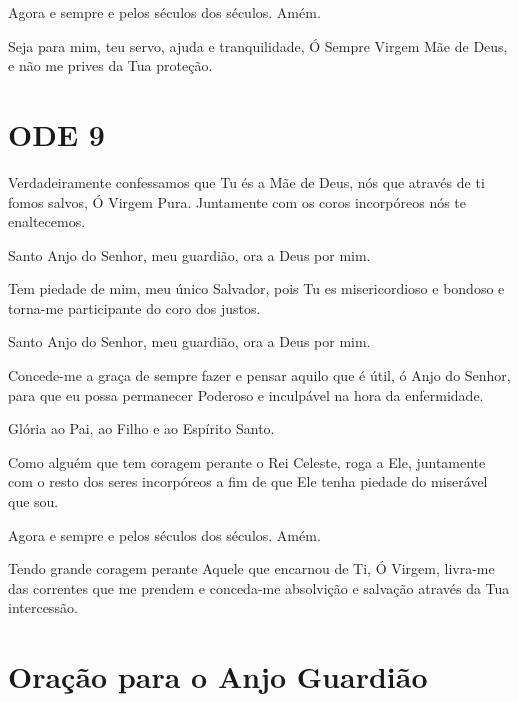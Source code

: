 \documentclass{subfiles}
\begin{document}
Agora e sempre e pelos séculos dos séculos. Amém.

Seja para mim, teu servo, ajuda e tranquilidade, Ó Sempre Virgem Mãe
de Deus, e não me prives da Tua proteção.

\section*{ODE 9}

\eirmos{}Verdadeiramente confessamos que Tu és a Mãe de Deus, nós que
através de ti fomos salvos, Ó Virgem Pura. Juntamente com os coros
incorpóreos nós te enaltecemos.

Santo Anjo do Senhor, meu guardião, ora a Deus por mim.

Tem piedade de mim, meu único Salvador, pois Tu es misericordioso e
bondoso e torna-me participante do coro dos justos.

Santo Anjo do Senhor, meu guardião, ora a Deus por mim.

Concede-me a graça de sempre fazer e pensar aquilo que é útil, ó Anjo
do Senhor, para que eu possa permanecer Poderoso e inculpável na hora da
enfermidade.

Glória ao Pai, ao Filho e ao Espírito Santo.

Como alguém que tem coragem perante o Rei Celeste, roga a Ele,
juntamente com o resto dos seres incorpóreos a fim de que Ele tenha piedade
do miserável que sou.

Agora e sempre e pelos séculos dos séculos. Amém.

Tendo grande coragem perante Aquele que encarnou de Ti, Ó Virgem,
livra-me das correntes que me prendem e conceda-me absolvição e salvação
através da Tua intercessão.

\section*{Oração para o Anjo Guardião}
\end{document}
